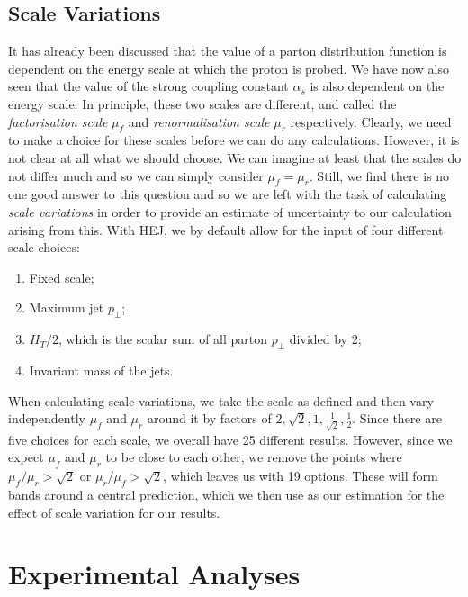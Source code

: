 \subsection{Scale Variations}

It has already been discussed that the value of a parton distribution function is dependent on the energy scale at which the proton is probed. We have now also seen that the value of the strong coupling constant $\alpha_s$ is also dependent on the energy scale. In principle, these two scales are different, and called the \emph{factorisation scale} $\mu_f$ and \emph{renormalisation scale} $\mu_r$ respectively. Clearly, we need to make a choice for these scales before we can do any calculations. However, it is not clear at all what we should choose. We can imagine at least that the scales do not differ much and so we can simply consider $\mu_f = \mu_r$. Still, we find there is no one good answer to this question and so we are left with the task of calculating \emph{scale variations} in order to provide an estimate of uncertainty to our calculation arising from this. With HEJ, we by default allow for the input of four different scale choices: 

\begin{enumerate}
\item{Fixed scale;}
\item{Maximum jet $p_\perp$;}
\item{$H_T/2$, which is the scalar sum of all parton $p_\perp$ divided by 2;}
\item{Invariant mass of the jets.}
\end{enumerate} 

When calculating scale variations, we take the scale as defined and then vary independently $\mu_f$ and $\mu_r$ around it by factors of $2, \sqrt{2}, 1, \frac{1}{\sqrt{2}}, \frac{1}{2}$. Since there are five choices for each scale, we overall have 25 different results. However, since we expect $\mu_f$ and $\mu_r$ to be close to each other, we remove the points where $\mu_f/\mu_r > \sqrt{2}$ or $\mu_r/\mu_f > \sqrt{2}$, which leaves us with 19 options. These will form bands around a central prediction, which we then use as our estimation for the effect of scale variation for our results. %

\section{Experimental Analyses}

